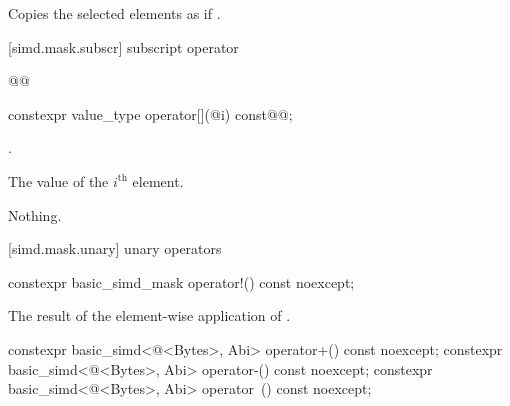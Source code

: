 \begin{itemdescr}
  \MaskStoreDescr
  {\validMaskedRange}
  {Copies the selected elements as if  \forallmaskedi.}
\end{itemdescr}

[simd.mask.subscr]{ subscript operator\texorpdfstring{}{s}}

\begin{wgBRem}
\begin{itemdecl}
@@
\end{itemdecl}

\begin{itemdescr}
  \pnum{}

  \pnum{}

  \pnum{}
\end{itemdescr}
\end{wgBRem}

\begin{itemdecl}
constexpr value_type operator[](@\simdsizetype@ i) const@\wgRem{\&}@;
\end{itemdecl}

\begin{itemdescr}
  \pnum\expects
  .

  \pnum\returns
  The value of the $i^\text{th}$ element.

  \pnum\throws Nothing.
\end{itemdescr}

[simd.mask.unary]{ unary operators}

\begin{itemdecl}
constexpr basic_simd_mask operator!() const noexcept;
\end{itemdecl}

\begin{itemdescr}
  \pnum\returns
  The result of the element-wise application of .
\end{itemdescr}

\begin{itemdecl}
constexpr basic_simd<@\integerfrom@<Bytes>, Abi> operator+() const noexcept;
constexpr basic_simd<@\integerfrom@<Bytes>, Abi> operator-() const noexcept;
constexpr basic_simd<@\integerfrom@<Bytes>, Abi> operator~() const noexcept;
\end{itemdecl}

